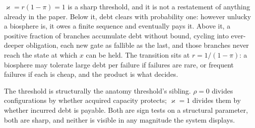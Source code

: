 \begin{remark}
\label{sch:rem:criticality}
$\varkappa=r(1-\pi)=1$ is a sharp threshold, and it is not a restatement of
anything already in the paper. Below it, debt clears with probability one: however unlucky a biosphere
is, it owes a finite sequence and eventually pays it. Above it, a
positive fraction of branches accumulate debt without bound, cycling
into ever-deeper obligation, each new gate as fallible as the last, and those branches never reach the state at which $x$ can be held. The
transition sits at $r=1/(1-\pi)$: a biosphere may tolerate large debt
per failure if failures are rare, or frequent failures if each is cheap,
and the product is what decides.

The threshold is structurally the anatomy threshold's sibling. $\rho=0$
divides configurations by whether acquired capacity protects; $\varkappa=1$
divides them by whether incurred debt is payable. Both are sign tests on
a structural parameter, both are sharp, and neither is visible in any
magnitude the system displays.
\end{remark}

